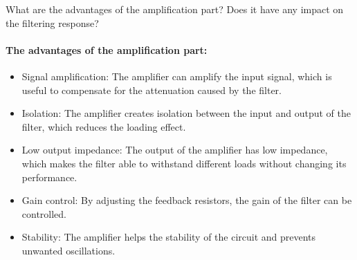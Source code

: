 \documentclass[11pt]{article}
\begin{document}
\begin{question}
\begin{subquestion}{What are the advantages of the amplification part? Does it have any impact on the filtering response?}
{            \paragraph*{The advantages of the amplification part:}
            \begin{itemize}
                \item Signal amplification: The amplifier can amplify the input signal, which is useful to compensate for the attenuation caused by the filter.
                \item Isolation: The amplifier creates isolation between the input and output of the filter, which reduces the loading effect.
                \item Low output impedance: The output of the amplifier has low impedance, which makes the filter able to withstand different loads without changing its performance.
                \item Gain control: By adjusting the feedback resistors, the gain of the filter can be controlled.
                \item Stability: The amplifier helps the stability of the circuit and prevents unwanted oscillations.
            \end{itemize}
}
\end{subquestion}
\end{question}
\end{document}
